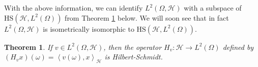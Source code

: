 \documentclass{article}
\newtheorem{theorem}{Theorem}
\numberwithin{theorem}{section}
\numberwithin{lemma}{section}
\numberwithin{definition}{section}
\numberwithin{assumption}{section}
\numberwithin{proposition}{section}
\numberwithin{remark}{section}
\numberwithin{corollary}{section}
\numberwithin{conjecture}{section}
\numberwithin{example}{section}
\newcommand{\bset}[1]{\left \lbrace #1 \right \rbrace}
\newcommand{\aset}[1]{\left \langle #1 \right \rangle}
\newcommand{\HS}{\mathrm{HS}}
\begin{document}
\begin{multicols*}{2}

With the above information, we can identify $L^2(\Omega, \mathcal H)$ with a subspace of $\HS(\mathcal H, L^2(\Omega))$ from Theorem \ref{v induces a HS operator} below. We will soon see that in fact $L^2(\Omega, \mathcal H)$ is isometrically isomorphic to $\HS(\mathcal H, L^2(\Omega))$.




\begin{theorem} \label{v induces a HS operator}
If $v \in L^2(\Omega, \mathcal H)$, then the operator $H_v: \mathcal H \to L^2(\Omega)$ defined by $(H_vx)(\omega) = \aset{v(\omega), x}_\mathcal H$ is Hilbert-Schmidt.
\end{theorem}


\end{multicols*}
\end{document}
